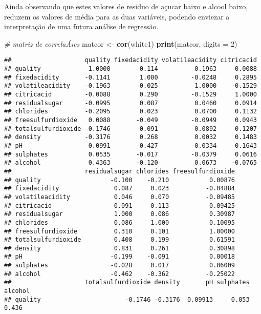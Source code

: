 \documentclass[]{article}
\newenvironment{Shaded}{\begin{snugshade}}{\end{snugshade}}
\newcommand{\KeywordTok}[1]{\textcolor[rgb]{0.13,0.29,0.53}{\textbf{#1}}}
\newcommand{\DataTypeTok}[1]{\textcolor[rgb]{0.13,0.29,0.53}{#1}}
\newcommand{\DecValTok}[1]{\textcolor[rgb]{0.00,0.00,0.81}{#1}}
\newcommand{\StringTok}[1]{\textcolor[rgb]{0.31,0.60,0.02}{#1}}
\newcommand{\CommentTok}[1]{\textcolor[rgb]{0.56,0.35,0.01}{\textit{#1}}}
\newcommand{\NormalTok}[1]{#1}
\begin{document}
Ainda observando que estes valores de residuo de açucar baixo e alcool
baixo, reduzem os valores de média para as duas variáveis, podendo
enviezar a interpretação de uma futura análise de regressão.

\begin{Shaded}
\begin{Highlighting}[]
\CommentTok{# matriz de correlaÁıes}
\NormalTok{matcor <-}\StringTok{ }\KeywordTok{cor}\NormalTok{(white1)}
\KeywordTok{print}\NormalTok{(matcor, }\DataTypeTok{digits =} \DecValTok{2}\NormalTok{)}
\end{Highlighting}
\end{Shaded}

\begin{verbatim}
##                    quality fixedacidity volatileacidity citricacid
## quality             1.0000       -0.114         -0.1963    -0.0088
## fixedacidity       -0.1141        1.000         -0.0248     0.2895
## volatileacidity    -0.1963       -0.025          1.0000    -0.1529
## citricacid         -0.0088        0.290         -0.1529     1.0000
## residualsugar      -0.0995        0.087          0.0460     0.0914
## chlorides          -0.2095        0.023          0.0700     0.1132
## freesulfurdioxide   0.0088       -0.049         -0.0949     0.0943
## totalsulfurdioxide -0.1746        0.091          0.0892     0.1207
## density            -0.3176        0.268          0.0032     0.1483
## pH                  0.0991       -0.427         -0.0334    -0.1643
## sulphates           0.0535       -0.017         -0.0379     0.0616
## alcohol             0.4363       -0.120          0.0673    -0.0765
##                    residualsugar chlorides freesulfurdioxide
## quality                   -0.100    -0.210           0.00876
## fixedacidity               0.087     0.023          -0.04884
## volatileacidity            0.046     0.070          -0.09485
## citricacid                 0.091     0.113           0.09425
## residualsugar              1.000     0.086           0.30987
## chlorides                  0.086     1.000           0.10095
## freesulfurdioxide          0.310     0.101           1.00000
## totalsulfurdioxide         0.408     0.199           0.61591
## density                    0.831     0.261           0.30898
## pH                        -0.199    -0.091           0.00018
## sulphates                 -0.028     0.017           0.06009
## alcohol                   -0.462    -0.362          -0.25022
##                    totalsulfurdioxide density       pH sulphates alcohol
## quality                       -0.1746 -0.3176  0.09913     0.053   0.436

\end{verbatim}
\end{document}
